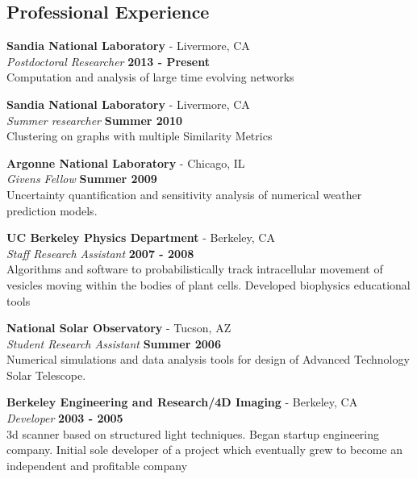 \documentclass[margin,line]{res}
\begin{document}
\begin{resume}
\section{\sc Professional Experience}

{\bf Sandia National Laboratory } - Livermore, CA\\
{\em Postdoctoral Researcher} \hfill {\bf 2013 - Present}\\
Computation and analysis of large time evolving networks

{\bf Sandia National Laboratory } - Livermore, CA\\
{\em Summer researcher} \hfill {\bf Summer 2010}\\
Clustering on graphs with multiple Similarity Metrics 

{\bf Argonne National Laboratory} - Chicago, IL\\
{\em Givens Fellow} \hfill {\bf Summer 2009}\\
Uncertainty quantification and sensitivity analysis of numerical weather prediction models.

{\bf UC Berkeley Physics Department} - Berkeley, CA\\
{\em Staff Research Assistant} \hfill {\bf 2007 - 2008}\\
Algorithms and software to probabilistically track intracellular movement of vesicles moving within the bodies of plant cells. Developed biophysics educational tools

{\bf National Solar Observatory} - Tucson, AZ\\
{\em Student Research Assistant} \hfill {\bf Summer 2006}\\
Numerical simulations and data analysis tools for design of Advanced Technology Solar Telescope.

{\bf Berkeley Engineering and Research/4D Imaging} - Berkeley, CA\\
{\em Developer} \hfill {\bf 2003 - 2005}\\
3d scanner based on structured light techniques. Began startup engineering company. Initial sole developer of a project which eventually grew to become an independent and profitable company


\end{resume}
\end{document}

